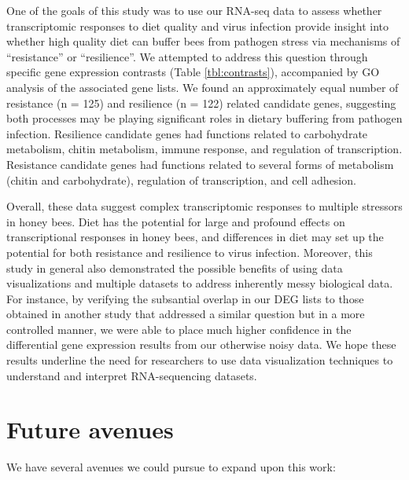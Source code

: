 \documentclass[11pt,a4paper,oldfontcommands,openany]{memoir}
\numberwithin{equation}{section} %
\begin{document}
One of the goals of this study was to use our RNA-seq data to assess whether transcriptomic responses to diet quality and virus infection provide insight into whether high quality diet can buffer bees from pathogen stress via mechanisms of ``resistance'' or ``resilience''. We attempted to address this question through specific gene expression contrasts (Table \ref{tbl:contrasts}), accompanied by GO analysis of the associated gene lists. We found an approximately equal number of resistance (n = 125) and resilience (n = 122) related candidate genes, suggesting both processes may be playing significant roles in dietary buffering from pathogen infection. Resilience candidate genes had functions related to carbohydrate metabolism, chitin metabolism, immune response, and regulation of transcription. Resistance candidate genes had functions related to several forms of metabolism (chitin and carbohydrate), regulation of transcription, and cell adhesion.  

Overall, these data suggest complex transcriptomic responses to multiple stressors in honey bees. Diet has the potential for large and profound effects on transcriptional responses in honey bees, and differences in diet may set up the potential for both resistance and resilience to virus infection. Moreover, this study in general also demonstrated the possible benefits of using data visualizations and multiple datasets to address inherently messy biological data. For instance, by verifying the subsantial overlap in our DEG lists to those obtained in another study that addressed a similar question but in a more controlled manner, we were able to place much higher confidence in the differential gene expression results from our otherwise noisy data. We hope these results underline the need for researchers to use data visualization techniques to understand and interpret RNA-sequencing datasets.



\section{Future avenues}

We have several avenues we could pursue to expand upon this work:
\end{document}
